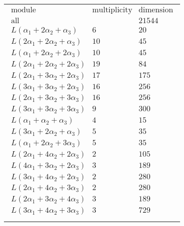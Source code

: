 \documentclass[crop,border=2mm]{standalone}
\begin{document}
\begin{tabular}{l}
$\displaystyle
\begin{array}{rll}
	\text{module}&\text{multiplicity}&\text{dimension} \\ \hline \text{all}&&21544 \\
	L\left(\alpha_{1}+ 2\alpha_{2}+\alpha_{3}\right)&6&20\\
	L\left( 2\alpha_{1}+ 2\alpha_{2}+\alpha_{3}\right)&10&45\\
	L\left(\alpha_{1}+ 2\alpha_{2}+ 2\alpha_{3}\right)&10&45\\
	L\left( 2\alpha_{1}+ 2\alpha_{2}+ 2\alpha_{3}\right)&19&84\\
	L\left( 2\alpha_{1}+ 3\alpha_{2}+ 2\alpha_{3}\right)&17&175\\
	L\left( 3\alpha_{1}+ 3\alpha_{2}+ 2\alpha_{3}\right)&16&256\\
	L\left( 2\alpha_{1}+ 3\alpha_{2}+ 3\alpha_{3}\right)&16&256\\
	L\left( 3\alpha_{1}+ 3\alpha_{2}+ 3\alpha_{3}\right)&9&300\\
	L\left(\alpha_{1}+\alpha_{2}+\alpha_{3}\right)&4&15\\
	L\left( 3\alpha_{1}+ 2\alpha_{2}+\alpha_{3}\right)&5&35\\
	L\left(\alpha_{1}+ 2\alpha_{2}+ 3\alpha_{3}\right)&5&35\\
	L\left( 2\alpha_{1}+ 4\alpha_{2}+ 2\alpha_{3}\right)&2&105\\
	L\left( 4\alpha_{1}+ 3\alpha_{2}+ 2\alpha_{3}\right)&3&189\\
	L\left( 3\alpha_{1}+ 4\alpha_{2}+ 2\alpha_{3}\right)&2&280\\
	L\left( 2\alpha_{1}+ 4\alpha_{2}+ 3\alpha_{3}\right)&2&280\\
	L\left( 2\alpha_{1}+ 3\alpha_{2}+ 4\alpha_{3}\right)&3&189\\
	L\left( 3\alpha_{1}+ 4\alpha_{2}+ 3\alpha_{3}\right)&3&729
\end{array}
$ \\ \\

\end{tabular}
\end{document}
